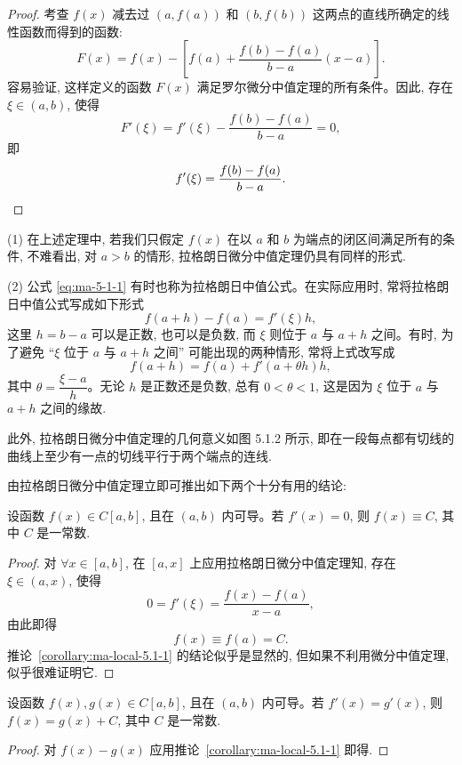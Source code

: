 \begin{proof}
考查 $f(x)$ 减去过 $(a,f(a))$ 和 $(b,f(b))$ 这两点的直线所确定的线性函数而得到的函数:
\[
  F(x)=f(x)-\left[f(a)+\frac{f(b)-f(a)}{b-a}(x-a)\right].
\]
容易验证, 这样定义的函数 $F(x)$ 满足罗尔微分中值定理的所有条件。因此, 存在 $\xi\in(a,b)$, 使得
\[
  F'(\xi)=f'(\xi)-\frac{f(b)-f(a)}{b-a}=0,
\]
即
\[
  f'(\xi)=\frac{f(b)-f(a)}{b-a}.
\qedhere
\]
\end{proof}


\begin{remark}\label{remark:ma-5-source-15}
(1) 在上述定理中, 若我们只假定 $f(x)$ 在以 $a$ 和 $b$ 为端点的闭区间满足所有的条件, 不难看出, 对 $a>b$ 的情形, 拉格朗日微分中值定理仍具有同样的形式.

(2) 公式 \eqref{eq:ma-5-1-1} 有时也称为拉格朗日中值公式。在实际应用时, 常将拉格朗日中值公式写成如下形式
\[
  f(a+h)-f(a)=f'(\xi)h,
\]
这里 $h=b-a$ 可以是正数, 也可以是负数, 而 $\xi$ 则位于 $a$ 与 $a+h$ 之间。有时, 为了避免 ``$\xi$ 位于 $a$ 与 $a+h$ 之间'' 可能出现的两种情形, 常将上式改写成
\[
  f(a+h)=f(a)+f'(a+\theta h)h,
\]
其中 $\theta=\dfrac{\xi-a}{h}$。无论 $h$ 是正数还是负数, 总有 $0<\theta<1$, 这是因为 $\xi$ 位于 $a$ 与 $a+h$ 之间的缘故.
\end{remark}

此外, 拉格朗日微分中值定理的几何意义如图 5.1.2 所示, 即在一段每点都有切线的曲线上至少有一点的切线平行于两个端点的连线.

由拉格朗日微分中值定理立即可推出如下两个十分有用的结论:

\begin{corollary}\label{corollary:ma-local-5.1-1}
设函数 $f(x)\in C[a,b]$, 且在 $(a,b)$ 内可导。若 $f'(x)=0$, 则 $f(x)\equiv C$, 其中 $C$ 是一常数.
\end{corollary}


\begin{proof}
对 $\forall x\in[a,b]$, 在 $[a,x]$ 上应用拉格朗日微分中值定理知, 存在 $\xi\in(a,x)$, 使得
\[
  0=f'(\xi)=\frac{f(x)-f(a)}{x-a},
\]
由此即得
\[
  f(x)\equiv f(a)=C.
\]
推论~\ref{corollary:ma-local-5.1-1} 的结论似乎是显然的, 但如果不利用微分中值定理, 似乎很难证明它.
\end{proof}


\begin{corollary}\label{corollary:ma-local-5.1-2}
设函数 $f(x),g(x)\in C[a,b]$, 且在 $(a,b)$ 内可导。若 $f'(x)=g'(x)$, 则 $f(x)=g(x)+C$, 其中 $C$ 是一常数.
\end{corollary}


\begin{proof}
对 $f(x)-g(x)$ 应用推论~\ref{corollary:ma-local-5.1-1} 即得.
\end{proof}


